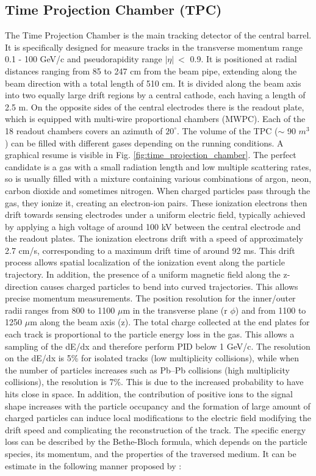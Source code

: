 \documentclass[12pt,a4paper]{book}
\begin{document}
	\subsection{Time Projection Chamber (TPC)}
	The Time Projection Chamber is the main
	tracking detector of the central barrel. It is specifically designed for measure tracks in the transverse momentum range 0.1 - 100 GeV/c and pseudorapidity range $|\eta| \ <$ 0.9.  It is positioned at radial distances ranging from 85 to 247 cm from the beam pipe, extending along the beam direction with a total length of 510 cm. It is divided along the beam axis into two equally large drift regions by a central cathode, each having a length of 2.5 m. On the opposite sides of the central electrodes there is the readout plate, which is equipped with multi-wire proportional chambers (MWPC). Each of the 18 readout chambers covers an azimuth of $20^{\circ}$. The volume of the TPC ($\sim$ 90 $m^3$) can be filled with different gases depending on the running conditions. A graphical resume is visible in Fig. \ref{fig:time_projection_chamber}. The perfect candidate is a gas with a small radiation length and low multiple scattering rates, so is usually filled with a mixture containing various combinations of argon, neon, carbon dioxide and sometimes nitrogen. When charged particles pass through the gas, they ionize it, creating an electron-ion pairs. These ionization electrons then drift towards sensing electrodes under a uniform electric field, typically achieved by applying a high voltage of around 100 kV between the central electrode and the readout plates. The ionization electrons drift with a speed of approximately 2.7 cm/s, corresponding to a maximum drift time of around 92 ms. This drift process allows spatial localization of the ionization event along the particle trajectory. In addition, the presence of a uniform magnetic field along the z-direction causes charged particles to bend into curved trajectories. This allows precise momentum measurements.  The position resolution for the inner/outer radii ranges from 800 to 1100 $\mu$m in the transverse plane (r $\phi$) and from 1100 to 1250 $\mu$m along the beam axis (z). The total charge collected at the end plates for each track is proportional to the particle energy loss in the gas. This allows a sampling of the dE/dx and therefore perform PID below 1 GeV/c. The resolution on the dE/dx is 5\% for isolated tracks (low multiplicity collisions), while when the number of particles increases such as Pb–Pb collisions (high multiplicity collisions), the resolution is 7\%. This is due to the increased probability to have hits close in space. In addition, the contribution of positive ions to the signal shape increases with the particle occupancy and the formation of large amount of charged particles can induce local modifications to the electric field modifying the drift speed and complicating the reconstruction of the track. The specific energy loss can be described by the Bethe-Bloch formula, which depends on the particle species, its momentum, and the properties of the traversed medium. It can be estimate in the following manner proposed by \cite{Rolandi:2008ujz}:
\end{document}
